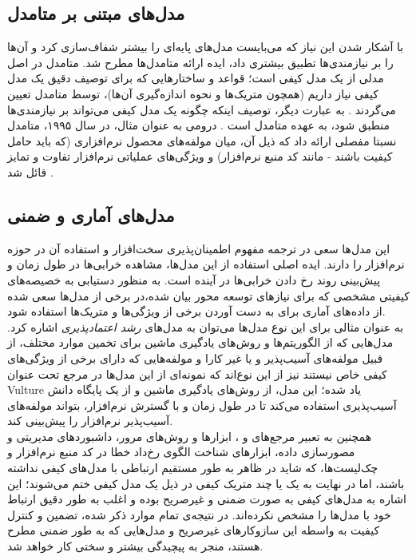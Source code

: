 \subsection{مدل‌های مبتنی بر متامدل}
با آشکار شدن این نیاز که می‌بایست مدل‌های پایه‌ای را بیشتر شفاف‌سازی کرد و آن‌ها را بر نیازمندی‌ها تطبیق بیشتری داد، ایده ارائه متامدل‌ها مطرح شد. متامدل در اصل مدلی از یک مدل کیفی است؛ قواعد و ساختارهایی که برای توصیف دقیق یک مدل کیفی نیاز داریم (همچون متریک‌ها و نحوه اندازه‌گیری آن‌ها)، توسط متامدل تعیین می‌گردند
\cite{deissenboeck_software_2009}.
به عبارت دیگر، توصیف اینکه چگونه یک مدل کیفی می‌تواند بر نیازمندی‌ها منطبق شود، به عهده متامدل است
\cite{wagner_software_2013}.
درومی به عنوان مثال، در سال ۱۹۹۵، متامدل نسبتا مفصلی ارائه داد که ذیل آن، میان مولفه‌های محصول نرم‌افزاری (که باید حامل کیفیت باشند - مانند کد منبع نرم‌افزار) و ویژگی‌های عملیاتی نرم‌افزار تفاوت و تمایز قائل شد
\cite{dromey_model_1995}.
\subsection{مدل‌های آماری و ضمنی}
این مدل‌ها سعی در ترجمه مفهوم اطمینان‌پذیری سخت‌افزار و استفاده آن در حوزه نرم‌افزار را دارند. ایده اصلی استفاده از این مدل‌ها، مشاهده خرابی‌ها در طول زمان و پیش‌بینی روند رخ دادن خرابی‌ها در آینده است. به منظور دستیابی به خصیصه‌های کیفیتی مشخصی که برای نیازهای توسعه محور بیان شده،در برخی از مدل‌ها سعی شده از داده‌های آماری برای به دست آوردن برخی از ویژگی‌ها و متریک‌ها استفاده شود.\\
به عنوان مثالی برای این نوع مدل‌ها می‌توان به مدل‌های
\textit{رشد اعتمادپذیری}
\cite{musa_software_2004}
اشاره کرد. مدل‌هایی که از الگوریتم‌ها و روش‌های یادگیری ماشین برای تخمین موارد مختلف، از قبیل مولفه‌های آسیب‌پذیر و یا غیر کارا و مولفه‌هایی که دارای برخی از ویژگی‌های کیفی خاص نیستند نیز از این نوع‌اند که نمونه‌ای از این مدل‌ها در مرجع
\cite{neuhaus_predicting_2007}
تحت عنوان Vulture یاد شده؛ این مدل، از روش‌های یادگیری ماشین و از یک پایگاه دانش آسیب‌پذیری استفاده می‌کند تا در طول زمان و با گسترش نرم‌افزار، بتواند مولفه‌های آسیب‌پذیر نرم‌افزار را پیش‌بینی کند.\\
همچنین به تعبیر مرجع‌های
\cite{sommerville_software_2016}
و
\cite{wagner_software_2013}،
ابزارها و روش‌های مرور، داشبوردهای مدیریتی و مصورسازی داده، ابزارهای شناخت الگوی رخ‌داد خطا در کد منبع نرم‌افزار و چک‌لیست‌ها، که شاید در ظاهر به طور مستقیم ارتباطی با مدل‌های کیفی نداشته باشند، اما در نهایت به یک یا چند متریک کیفی در ذیل یک مدل کیفی ختم می‌شوند؛ این اشاره به مدل‌های کیفی به صورت ضمنی و غیرصریح بوده و اغلب به طور دقیق ارتباط خود با مدل‌ها را مشخص نکرده‌اند. در نتیجه‌ی ‌تمام موارد ذکر شده، تضمین و کنترل کیفیت به واسطه این سازوکارهای غیرصریح و مدل‌هایی که به طور ضمنی مطرح هستند، منجر به پیچیدگی بیشتر و سختی کار خواهد شد.

